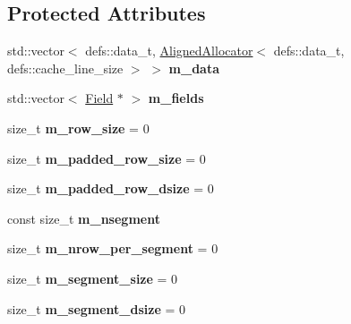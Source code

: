 \subsection*{Protected Attributes}
\begin{DoxyCompactItemize}
\item 
std\+::vector$<$ defs\+::data\+\_\+t, \hyperlink{classAlignedAllocator}{Aligned\+Allocator}$<$ defs\+::data\+\_\+t, defs\+::cache\+\_\+line\+\_\+size $>$ $>$ {\bfseries m\+\_\+data}\hypertarget{classTable_ac53b53b44f038757f4ff525f1c40af29}{}\label{classTable_ac53b53b44f038757f4ff525f1c40af29}

\item 
std\+::vector$<$ \hyperlink{classField}{Field} $\ast$ $>$ {\bfseries m\+\_\+fields}\hypertarget{classTable_a34c933ab7a70f8993497ca038b9cf07d}{}\label{classTable_a34c933ab7a70f8993497ca038b9cf07d}

\item 
size\+\_\+t {\bfseries m\+\_\+row\+\_\+size} = 0\hypertarget{classTable_aeced958ceec106a4f1363626f591a3a7}{}\label{classTable_aeced958ceec106a4f1363626f591a3a7}

\item 
size\+\_\+t {\bfseries m\+\_\+padded\+\_\+row\+\_\+size} = 0\hypertarget{classTable_a36ec3e1ff200630605d6089d558e2e70}{}\label{classTable_a36ec3e1ff200630605d6089d558e2e70}

\item 
size\+\_\+t {\bfseries m\+\_\+padded\+\_\+row\+\_\+dsize} = 0\hypertarget{classTable_a1ad9d14adc0644eded9e1d0a6bc26172}{}\label{classTable_a1ad9d14adc0644eded9e1d0a6bc26172}

\item 
const size\+\_\+t {\bfseries m\+\_\+nsegment}\hypertarget{classTable_a461b749bf81e9ada2ff2556038d466a3}{}\label{classTable_a461b749bf81e9ada2ff2556038d466a3}

\item 
size\+\_\+t {\bfseries m\+\_\+nrow\+\_\+per\+\_\+segment} = 0\hypertarget{classTable_a4de9366dc6dfd1ed4460e1ab1a4ca234}{}\label{classTable_a4de9366dc6dfd1ed4460e1ab1a4ca234}

\item 
size\+\_\+t {\bfseries m\+\_\+segment\+\_\+size} = 0\hypertarget{classTable_a68ee298859ca4c2970322c9ba8941a80}{}\label{classTable_a68ee298859ca4c2970322c9ba8941a80}

\item 
size\+\_\+t {\bfseries m\+\_\+segment\+\_\+dsize} = 0\hypertarget{classTable_a3ddcc771a935fe76cde1e8ec334c3e30}{}\label{classTable_a3ddcc771a935fe76cde1e8ec334c3e30}


\end{DoxyCompactItemize}
